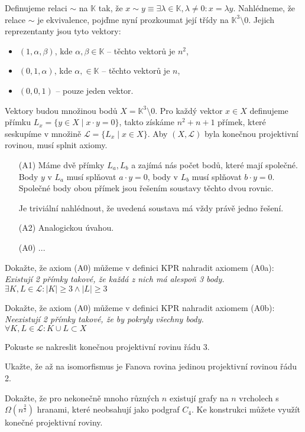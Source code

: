 \begin{t_proof}
  Definujeme relaci $\sim$ na $\mathbb{K}$ tak, že $x\sim y\equiv \exists\lambda\in\mathbb{K}, \lambda\neq 0:x=\lambda y$. Nahlédneme, že relace $\sim$ je ekvivalence, pojďme nyní prozkoumat její třídy na $\mathbb{K}^3\setminus 0$. Jejich reprezentanty jsou tyto vektory:
  \begin{itemize}
    \item $(1,\alpha,\beta)$, kde $\alpha,\beta\in\mathbb{K}$ – těchto vektorů je $n^2$,
    \item $(0,1,\alpha)$, kde $\alpha,\in\mathbb{K}$ – těchto vektorů je $n$,
    \item $(0,0,1)$ – pouze jeden vektor.
  \end{itemize}
  
  Vektory budou množinou bodů $X=\mathbb{K}^3\setminus 0$. Pro každý vektor $x\in X$ definujeme přímku $L_x=\{y\in X\mid x\cdot y=0\}$, takto získáme $n^2+n+1$ přímek, které seskupíme v množině $\mathcal{L}=\{L_x\mid x\in X\}$. Aby $(X,\mathcal{L})$ byla konečnou projektivní rovinou, musí splnit axiomy.
  \begin{enumerate}
    \item[(A1)] Máme dvě přímky $L_a, L_b$ a zajímá nás počet bodů, které mají společné. Body $y$ v $L_a$ musí splňovat $a\cdot y=0$, body v $L_b$ musí splňovat $b\cdot y=0$. Společné body obou přímek jsou řešením soustavy těchto dvou rovnic.
    
    Je triviální nahlédnout, že uvedená soustava má vždy právě jedno řešení.
    
    \item[(A2)] Analogickou úvahou.
    
    \item[(A0)] ... %
  \end{enumerate}
\end{t_proof}

\begin{t_exercise}
  \item Dokažte, že axiom (A0) můžeme v definici KPR nahradit axiomem (A0a):\\
  \textit{Existují 2 přímky takové, že každá z nich má alespoň 3 body.}
  \\$\exists K, L\in\mathcal{L}:|K|\geq 3\wedge|L|\geq 3$
  
  \item Dokažte, že axiom (A0) můžeme v definici KPR nahradit axiomem (A0b):\\
  \textit{Neexistují 2 přímky takové, že by pokryly všechny body.}
  \\$\forall K, L\in\mathcal{L}:K\cup L\subset X$
  
  \item Pokuste se nakreslit konečnou projektivní rovinu řádu 3.
  
  \item Ukažte, že až na isomorfismus je Fanova rovina jedinou projektivní rovinou řádu 2.
  
  \item Dokažte, že pro nekonečně mnoho různých $n$ existují grafy na $n$ vrcholech s $\Omega(n^\frac{3}{2})$ hranami, které neobsahují jako podgraf $C_4$. Ke konstrukci můžete využít konečné projektivní roviny.
\end{t_exercise}